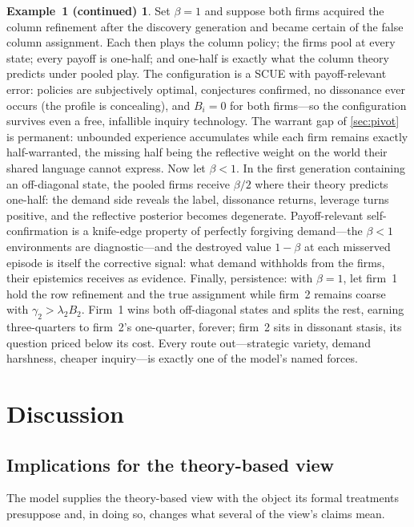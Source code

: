 \documentclass[11pt]{article}
\theoremstyle{definition}
\newtheorem*{excont}{Example~1 (continued)}
\begin{document}
\begin{excont}
Set $\beta=1$ and suppose both firms acquired the column refinement after
the discovery generation and became certain of the false column assignment.
Each then plays the column policy; the firms pool at every state; every
payoff is one-half; and one-half is exactly what the column theory predicts
under pooled play.  The configuration is a SCUE with payoff-relevant error:
policies are subjectively optimal, conjectures confirmed, no dissonance ever
occurs (the profile is concealing), and $B_i=0$ for both firms---so the
configuration survives even a free, infallible inquiry technology.  The
warrant gap of \cref{sec:pivot} is permanent: unbounded experience
accumulates while each firm remains exactly half-warranted, the missing half
being the reflective weight on the world their shared language cannot
express.  Now let $\beta<1$.  In the first generation containing an
off-diagonal state, the pooled firms receive $\beta/2$ where their theory
predicts one-half: the demand side reveals the label, dissonance returns,
leverage turns positive, and the reflective posterior becomes degenerate.
Payoff-relevant self-confirmation is a knife-edge property of perfectly
forgiving demand---the $\beta<1$ environments are diagnostic---and the
destroyed value $1-\beta$ at each misserved episode is itself the corrective
signal: what demand withholds from the firms, their epistemics receives as
evidence.  Finally, persistence: with $\beta=1$, let firm~1 hold the row
refinement and the true assignment while firm~2 remains coarse with
$\gamma_2>\lambda_2B_2$.  Firm~1 wins both off-diagonal states and splits
the rest, earning three-quarters to firm~2's one-quarter, forever; firm~2
sits in dissonant stasis, its question priced below its cost.  Every route
out---strategic variety, demand harshness, cheaper inquiry---is exactly one
of the model's named forces.
\end{excont}
\section{Discussion}
\label{sec:discussion}

\subsection{Implications for the theory-based view}

The model supplies the theory-based view with the object its formal
treatments presuppose and, in doing so, changes what several of the view's
claims mean.
\end{document}
